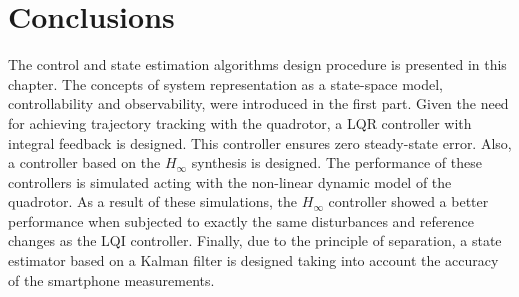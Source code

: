 \section{Conclusions}
The control and state estimation algorithms design procedure is presented in this chapter. The concepts of system representation as a state-space model, controllability and observability, were introduced in the first part. Given the need for achieving trajectory tracking with the quadrotor, a LQR controller with integral feedback is designed. This controller ensures zero steady-state error. Also, a controller based on the $H_\infty$ synthesis is designed. The performance of these controllers is simulated acting with the non-linear dynamic model of the quadrotor. As a result of these simulations, the $H_\infty$ controller showed a better performance when subjected to exactly the same disturbances and reference changes as the LQI controller.
Finally, due to the principle of separation, a state estimator based on a Kalman filter is designed taking into account the accuracy of the smartphone measurements.